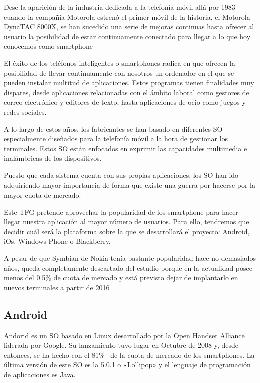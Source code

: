 Dese la aparición de la industria dedicada a la telefonía móvil allá por 1983 cuando la compañía
Motorola estrenó el primer móvil de la historia, el Motorola DynaTAC 8000X, se han sucedido una
serie de mejoras continuas hasta ofrecer al usuario la posibilidad de estar continuamente conectado
para llegar a lo que hoy conocemos como smartphone

El éxito de los teléfonos inteligentes o smartphones radica en que ofrecen la posibilidad de llevar
continuamente con nosotros un ordenador en el que se pueden instalar multitud de aplicaciones. Estos
programas tienen finalidades muy dispares, desde aplicaciones relacionadas con el ámbito laboral
como gestores de correo electrónico y editores de texto, hasta aplicaciones de ocio como juegos y
redes sociales.

A lo largo de estos años, los fabricantes se han basado en diferentes \acf{SO} especialmente
diseñados para la telefonía móvil a la hora de gestionar los terminales. Estos \acs{SO} están
enfocados en exprimir las capacidades multimedia e inalámbricas de los dispositivos.

Puesto que cada sistema cuenta con sus propias aplicaciones, los \acs{SO} han ido adquiriendo mayor
importancia de forma que existe una guerra por hacerse por la mayor cuota de mercado.

Este \acs{TFG} pretende aprovechar la popularidad de los smartphone para hacer llegar nuestra
aplicación al mayor número de usuarios. Para ello, tendremos que decidir cuál será la plataforma
sobre la que se desarrollará el proyecto: Android, iOs, Windows Phone o Blackberry.

A pesar de que Symbian de Nokia tenía bastante popularidad hace no demasiados años, queda
completamente descartado del estudio porque en la actualidad posee menos del 0.5\% de cuota de
mercado y está previsto dejar de implantarlo en nuevos terminales a partir de
2016~\cite{Litchfield13}.

\subsection{Android}

Andorid es un \acs{SO} basado en Linux desarrollado por la Open Handset Alliance liderada por
Google. Su lanzamiento tuvo lugar en Octubre de 2008 y, desde entonces, se ha hecho con el
81\%~\cite{Llamas13} de la cuota de mercado de los smartphones. La última versión de este \acs{SO}
 es la 5.0.1 o «Lollipop» y el lenguaje de programación de aplicaciones es Java.

